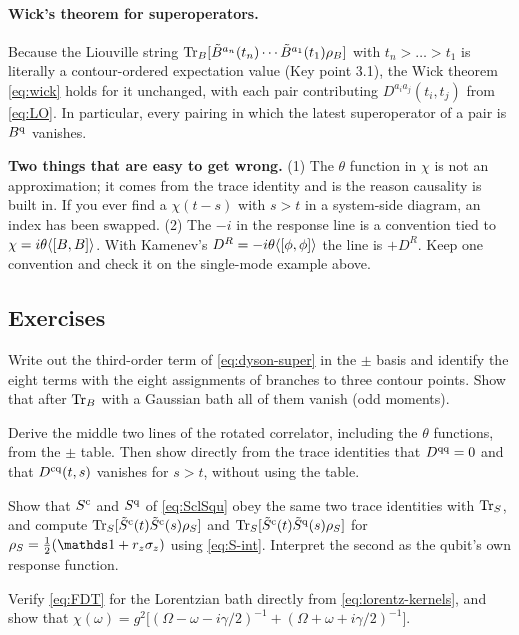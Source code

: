 \paragraph{Wick's theorem for superoperators.}
Because the Liouville string $\operatorname{Tr}_B[\tilde B^{a_n}(t_n)\cdots\tilde B^{a_1}(t_1)\rho_{B}]$ with
$t_n>\dots>t_1$ is literally a contour-ordered expectation value (Key point 3.1), the Wick
theorem \eqref{eq:wick} holds for it unchanged, with each pair contributing
$D^{a_ia_j}(t_i,t_j)$ from \cref{eq:LO}. In particular, every pairing in which the latest
superoperator of a pair is $B^{\mathrm{q}}$ vanishes.

\begin{warnbox}
\small\textbf{Two things that are easy to get wrong.} (1) The $\theta$ function in $\chi$ is
not an approximation; it comes from the trace identity and is the reason causality is
built in. If you ever find a $\chi(t-s)$ with $s>t$ in a system-side diagram, an index
has been swapped. (2) The $-i$ in the response line is a convention tied to
$\chi=i\theta\langle[B,B]\rangle$. With Kamenev's $D^R=-i\theta\langle[\phi,\phi]\rangle$ the line is
$+D^R$. Keep one convention and check it on the single-mode example above.
\end{warnbox}

\subsection{Exercises}

\begin{exercise}\label{ex:3-1}
Write out the third-order term of \cref{eq:dyson-super} in the $\pm$ basis and identify
the eight terms with the eight assignments of branches to three contour points. Show that
after $\operatorname{Tr}_B$ with a Gaussian bath all of them vanish (odd moments).
\end{exercise}

\begin{exercise}\label{ex:3-2}
Derive the middle two lines of the rotated correlator, including the $\theta$ functions,
from the $\pm$ table. Then show directly from the trace identities that $D^{\mathrm{q}\mathrm{q}}=0$
and that $D^{\mathrm{c}\mathrm{q}}(t,s)$ vanishes for $s>t$, without using the table.
\end{exercise}

\begin{exercise}\label{ex:3-3}
Show that $S^{\mathrm{c}}$ and $S^{\mathrm{q}}$ of \cref{eq:SclSqu} obey the same two trace identities with
$\operatorname{Tr}_S$, and compute $\operatorname{Tr}_S[\tilde S^{\mathrm{c}}(t)\tilde S^{\mathrm{c}}(s)\rho_S]$ and
$\operatorname{Tr}_S[\tilde S^{\mathrm{c}}(t)\tilde S^{\mathrm{q}}(s)\rho_S]$ for $\rho_S=\tfrac12(\Id+r_z\sz)$ using
\cref{eq:S-int}. Interpret the second as the qubit's own response function.
\end{exercise}

\begin{exercise}\label{ex:3-4}
Verify \cref{eq:FDT} for the Lorentzian bath directly from \cref{eq:lorentz-kernels}, and
show that $\chi(\omega)=g^2\big[(\Omega-\omega-i\gamma/2)^{-1}+(\Omega+\omega+i\gamma/2)^{-1}\big]$.
\end{exercise}

\clearpage
